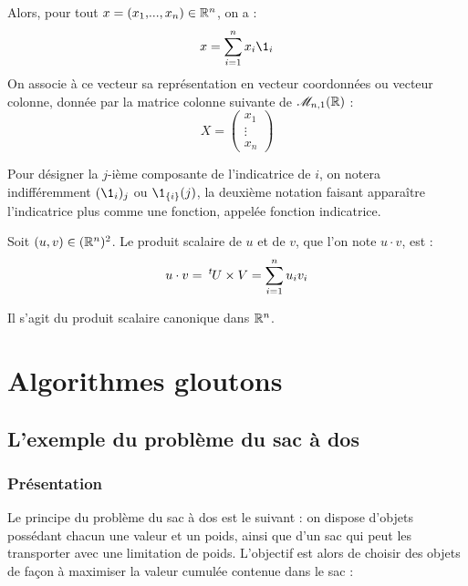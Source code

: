 		\pagebreak
		\begin{Rappel}
			Alors, pour tout \(x = (x_1,\!...,x_n) \in \mathbb{R}^n\), on a :
				\[x = \displaystyle \sum_{i=1}^n x_i \1_i\]
			On associe à ce vecteur sa représentation en vecteur coordonnées ou vecteur colonne, donnée par la matrice colonne suivante de \(\mathscr{M}_{n,1}(\mathbb{R})\) :
				\[
					X = \begin{pmatrix}
						x_1 \\
						\vdots \\
						x_n
						\end{pmatrix}
				\]
		\end{Rappel}
		
		\begin{Remarque}
			Pour désigner la \(j\)-ième composante de l'indicatrice de \(i\), on notera indifféremment \((\1_i)_j\) ou \(\1_{\{i\}}(j)\), la deuxième notation faisant apparaître l'indicatrice plus comme une fonction, appelée fonction indicatrice.
		\end{Remarque}
	
		\begin{Definition}
			Soit \((u,v) \in (\mathbb{R}^n)^2\). Le produit scalaire de \(u\) et de \(v\), que l'on note \(u\cdot v\), est :
				\[
					u \cdot v = \: ^t \hs{-0.3}U \times V = \sum_{i=1}^n u_iv_i
				\]
		\end{Definition}
		
		\begin{Remarque}
			Il s'agit du produit scalaire canonique dans \(\mathbb{R}^n\).
		\end{Remarque}
	
	\section{Algorithmes gloutons}
	
		\subsection{L'exemple du problème du sac à dos}
			
			\subsubsection{Présentation}
			
			Le principe du problème du sac à dos est le suivant : on dispose d'objets possédant chacun une valeur et un poids, ainsi que d'un sac qui peut les transporter avec une limitation de poids. L'objectif est alors de choisir des objets de façon à maximiser la valeur cumulée contenue dans le sac :
			
